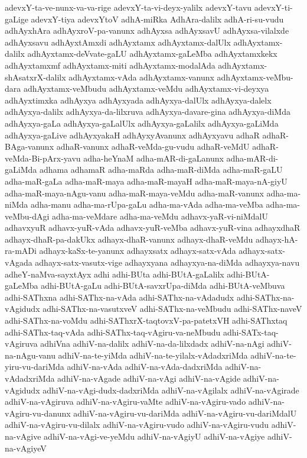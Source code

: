{adevxY-ta-ve-nunx-va-va-rige
adevxY-ta-vi-deyx-yalilx
adevxY-tavu
adevxY-ti-gaLige
adevxY-tiya
adevxYtoV
adhA-miRka
AdhAra-dalilx
adhA-ri-su-vudu
adhAyxhAra
adhAyxroV-pa-vanunx
adhAyxsa
adhAyxsavU
adhAyxsa-vilalxde
adhAyxsavu
adhAyxtAmxdi
adhAyxtamx
adhAyxtamx-dalUlx
adhAyxtamx-dalilx
adhAyxtamx-deVvate-gaLU
adhAyxtamx-gaLeMba
adhAyxtamxkekx
adhAyxtamxmf
adhAyxtamx-miti
adhAyxtamx-modalAda
adhAyxtamx-shAsatxrX-dalilx
adhAyxtamx-vAda
adhAyxtamx-vanunx
adhAyxtamx-veMbu-dara
adhAyxtamx-veMbudu
adhAyxtamx-veMdu
adhAyxtamx-vi-deyxya
adhAyxtimxka
adhAyxya
adhAyxyada
adhAyxya-dalUlx
adhAyxya-dalelx
adhAyxya-dalilx
adhAyxya-da-lilxruva
adhAyxya-davare-gina
adhAyxya-diMda
adhAyxya-gaLa
adhAyxya-gaLalUlx
adhAyxya-gaLalilx
adhAyxya-gaLiMda
adhAyxya-gaLive
adhAyxyakaH
adhAyxyAvanunx
adhAyxyavu
adhaR
adhaR-BAga-vanunx
adhaR-vanunx
adhaR-veMda-gu-vudu
adhaR-veMdU
adhaR-veMda-Bi-pArx-yavu
adha-heYnaM
adha-mAR-di-gaLanunx
adha-mAR-di-gaLiMda
adhama
adhamaR
adha-maRda
adha-maR-diMda
adha-maR-gaLU
adha-maR-gaLa
adha-maR-maya
adha-maR-mayaH
adha-maR-maya-nA-giyU
adha-maR-maya-nAgu-vanu
adha-maR-maya-veMdu
adha-maR-vanunx
adha-ma-niMda
adha-manu
adha-ma-rUpa-gaLu
adha-ma-vAda
adha-ma-veMba
adha-ma-veMbu-dAgi
adha-ma-veMdare
adha-ma-veMdu
adhavx-yaR-vi-niMdalU
adhavxyuR
adhavx-yuR-vAda
adhavx-yuR-veMba
adhavx-yuR-vina
adhayxdhaR
adhayx-dhaR-pa-dakUkx
adhayx-dhaR-vanunx
adhayx-dhaR-veMdu
adhayx-hA-ra-mADi
adhayx-kaSx-te-yanunx
adhayxsatx
adhayx-satx-vAda
adhayx-satx-vAgada
adhayx-satx-vasutx-vige
adhayxyana
adhayxya-na-diMda
adhayxya-navu
adheY-naMva-sayxtAyx
adhi
adhi-BUta
adhi-BUtA-gaLalilx
adhi-BUtA-gaLeMba
adhi-BUtA-gaLu
adhi-BUtA-savxrUpa-diMda
adhi-BUtA-veMbuva
adhi-SAThxna
adhi-SAThx-na-vAda
adhi-SAThx-na-vAdadudx
adhi-SAThx-na-vAgidudx
adhi-SAThx-na-vasutxveV
adhi-SAThx-na-veMbudu
adhi-SAThx-naveV
adhi-SAThx-na-voMdu
adhi-SAThxrX-taqtovxV-pa-patetxVH
adhi-SAThxtaq
adhi-SAThx-taq-vAda
adhi-SAThx-taq-vAgiru-va-neMbudu
adhi-SATx-taq-vAgiruva
adhiVna
adhiV-na-dalilx
adhiV-na-da-lilxdadx
adhiV-na-nAgi
adhiV-na-nAgu-vanu
adhiV-na-te-yiMda
adhiV-na-te-yilalx-vAdadxriMda
adhiV-na-te-yiru-vu-dariMda
adhiV-na-vAda
adhiV-na-vAda-dadxriMda
adhiV-na-vAdadxriMda
adhiV-na-vAgade
adhiV-na-vAgi
adhiV-na-vAgide
adhiV-na-vAgidudx
adhiV-na-vAgi-dudx-dadxriMda
adhiV-na-vAgilalx
adhiV-na-vAgirade
adhiV-na-vAgiruva
adhiV-na-vAgiru-vaMte
adhiV-na-vAgiru-vado
adhiV-na-vAgiru-vu-danunx
adhiV-na-vAgiru-vu-dariMda
adhiV-na-vAgiru-vu-dariMdalU
adhiV-na-vAgiru-vu-dilalx
adhiV-na-vAgiru-vudo
adhiV-na-vAgiru-vudu
adhiV-na-vAgive
adhiV-na-vAgi-ve-yeMdu
adhiV-na-vAgiyU
adhiV-na-vAgiye
adhiV-na-vAgiyeV
}

